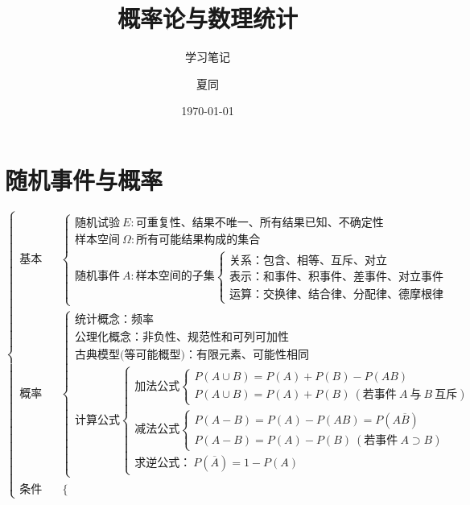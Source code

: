 \documentclass[lang=cn,11pt]{elegantbook}
\title{概率论与数理统计}
\subtitle{学习笔记}
\author{夏同}
\institute{华南理工大学}
\date{\today}
\begin{document}
\maketitle
\frontmatter

\tableofcontents
\makeenvindex

\mainmatter

\chapter{随机事件与概率}
{\scriptsize
\[
\begin{cases}
\text{基本概念} & 
\begin{cases}
\text{随机试验} \ E: \text{可重复性、结果不唯一、所有结果已知、不确定性} \\
\text{样本空间} \ \Omega: \text{所有可能结果构成的集合} \\
\text{随机事件} \ A: \text{样本空间的子集} 
\begin{cases}
\text{关系：包含、相等、互斥、对立} \\
\text{表示：和事件、积事件、差事件、对立事件} \\
\text{运算：交换律、结合律、分配律、德摩根律}
\end{cases}
\end{cases} \\
\text{概率概念} & 
\begin{cases}
\text{统计概念：频率} \\
\text{公理化概念：非负性、规范性和可列可加性} \\
\text{古典模型(等可能概型)：有限元素、可能性相同} \\
\text{计算公式}
\begin{cases}
\text{加法公式}
\begin{cases}
P(A \cup B) = P(A) + P(B) - P(AB) \\
P(A \cup B) = P(A) + P(B) \ (\text{若事件} \ A \ \text{与} \ B \ \text{互斥})
\end{cases} \\
\text{减法公式}
\begin{cases}
P(A - B) = P(A) - P(AB) = P(A\overline{B}) \\
P(A - B) = P(A) - P(B) \ (\text{若事件} \ A \supset B)
\end{cases} \\
\text{求逆公式：} \ P(\overline{A}) = 1 - P(A)
\end{cases}
\end{cases} \\
\text{条件概率概念} & 
\begin{cases}

\end{cases}
\end{cases}\]}
\end{document}
